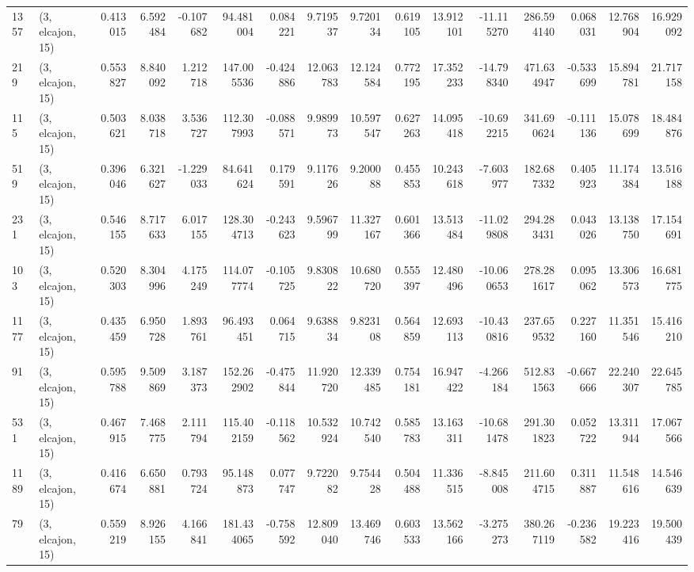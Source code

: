 \begin{tabular}{llrrrrrrrrrrrrrr}
1357 &  (3, elcajon, 15) &   0.413015 &   6.592484 &  -0.107682 &     94.481004 &    0.084221 &    9.719537 &    9.720134 &  0.619105 &  13.912101 & -11.115270 &   286.594140 &   0.068031 &  12.768904 &  16.929092 \\
219  &  (3, elcajon, 15) &   0.553827 &   8.840092 &   1.212718 &    147.005536 &   -0.424886 &   12.063783 &   12.124584 &  0.772195 &  17.352233 & -14.798340 &   471.634947 &  -0.533699 &  15.894781 &  21.717158 \\
115  &  (3, elcajon, 15) &   0.503621 &   8.038718 &   3.536727 &    112.307993 &   -0.088571 &    9.989973 &   10.597547 &  0.627263 &  14.095418 & -10.692215 &   341.690624 &  -0.111136 &  15.078699 &  18.484876 \\
519  &  (3, elcajon, 15) &   0.396046 &   6.321627 &  -1.229033 &     84.641624 &    0.179591 &    9.117626 &    9.200088 &  0.455853 &  10.243618 &  -7.603977 &   182.687332 &   0.405923 &  11.174384 &  13.516188 \\
231  &  (3, elcajon, 15) &   0.546155 &   8.717633 &   6.017155 &    128.304713 &   -0.243623 &    9.596799 &   11.327167 &  0.601366 &  13.513484 & -11.029808 &   294.283431 &   0.043026 &  13.138750 &  17.154691 \\
103  &  (3, elcajon, 15) &   0.520303 &   8.304996 &   4.175249 &    114.077774 &   -0.105725 &    9.830822 &   10.680720 &  0.555397 &  12.480496 & -10.060653 &   278.281617 &   0.095062 &  13.306573 &  16.681775 \\
1177 &  (3, elcajon, 15) &   0.435459 &   6.950728 &   1.893761 &     96.493451 &    0.064715 &    9.638834 &    9.823108 &  0.564859 &  12.693113 & -10.430816 &   237.659532 &   0.227160 &  11.351546 &  15.416210 \\
91   &  (3, elcajon, 15) &   0.595788 &   9.509869 &   3.187373 &    152.262902 &   -0.475844 &   11.920720 &   12.339485 &  0.754181 &  16.947422 &  -4.266184 &   512.831563 &  -0.667666 &  22.240307 &  22.645785 \\
531  &  (3, elcajon, 15) &   0.467915 &   7.468775 &   2.111794 &    115.402159 &   -0.118562 &   10.532924 &   10.742540 &  0.585783 &  13.163311 & -10.681478 &   291.301823 &   0.052722 &  13.311944 &  17.067566 \\
1189 &  (3, elcajon, 15) &   0.416674 &   6.650881 &   0.793724 &     95.148873 &    0.077747 &    9.722082 &    9.754428 &  0.504488 &  11.336515 &  -8.845008 &   211.604715 &   0.311887 &  11.548616 &  14.546639 \\
79   &  (3, elcajon, 15) &   0.559219 &   8.926155 &   4.166841 &    181.434065 &   -0.758592 &   12.809040 &   13.469746 &  0.603533 &  13.562166 &  -3.275273 &   380.267119 &  -0.236582 &  19.223416 &  19.500439 \\

\end{tabular}
